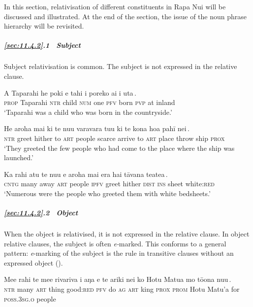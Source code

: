 In this section, relativisation of different constituents in Rapa Nui will be discussed and illustrated. At the end of the section, the issue of the noun phrase hierarchy will be revisited.

\subparagraph{\ref{sec:11.4.2}.1~ Subject} Subject relativisation is common. The subject is not expressed in the relative clause.

\ea\label{ex:11.88}
\gll A Taparahi he poki e tahi {\ob}i poreko ai {\ꞌ}i {\ꞌ}uta\,{\cb}. \\
\textsc{prop} Taparahi \textsc{ntr} child \textsc{num} one {\db}\textsc{pfv} born \textsc{pvp} at inland \\

\glt 
‘Taparahi was a child who was born in the countryside.’ \textstyleExampleref{[R250.001]} 
\z

\ea\label{ex:11.89}
\gll He {\ꞌ}aroha mai ki te nu{\ꞌ}u varavara {\ob}tu{\ꞌ}u ki te kona hoa pahī nei\,{\cb}. \\
\textsc{ntr} greet hither to \textsc{art} people scarce {\db}arrive to \textsc{art} place throw ship \textsc{prox} \\

\glt 
‘They greeted the few people who had come to the place where the ship was launched.’ \textstyleExampleref{[R250.235]} 
\z

\ea\label{ex:11.90}
\gll Ka rahi atu te nu{\ꞌ}u {\ob}e {\ꞌ}aroha mai era hai tāvana teatea\,{\cb}. \\
\textsc{cntg} many away \textsc{art} people {\db}\textsc{ipfv} greet hither \textsc{dist} \textsc{ins} sheet white:\textsc{red} \\

\glt 
‘Numerous were the people who greeted them with white bedsheets.’ \textstyleExampleref{[R210.087]} 
\z

\subparagraph{\ref{sec:11.4.2}.2~ Object} When the object is relativised, it is not expressed in the relative clause. In object relative clauses, the subject is often \textit{e}\textit{{}-}marked. This conforms to a general pattern: \textit{e}{}-marking of the subject is the rule in transitive clauses without an expressed object ().

\ea\label{ex:11.91}
\gll Me{\ꞌ}e rahi te me{\ꞌ}e rivariva {\ob}i aŋa e te {\ꞌ}ariki nei ko Hotu Matu{\ꞌ}a  mo tō{\ꞌ}ona nu{\ꞌ}u\,{\cb}.\\
\textsc{ntr} many \textsc{art} thing good:\textsc{red} {\db}\textsc{pfv} do \textsc{ag} \textsc{art} king \textsc{prox} \textsc{prom} Hotu Matu’a  for \textsc{poss.3sg.o} people\\

